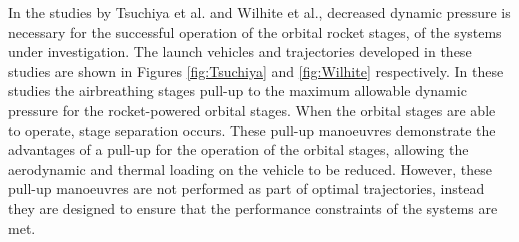 In the studies by Tsuchiya et al.\cite{Tsuchiya2005} and Wilhite et al.\cite{Wilhite1991}, decreased dynamic pressure is necessary for the successful operation of the orbital rocket stages, of the systems under investigation. The launch vehicles and trajectories developed in these studies are shown in Figures \ref{fig:Tsuchiya} and \ref{fig:Wilhite} respectively. In these studies the airbreathing stages pull-up to the maximum allowable dynamic pressure for the rocket-powered orbital stages. When the orbital stages are able to operate, stage separation occurs. These pull-up manoeuvres demonstrate the advantages of a pull-up for the operation of the orbital stages, allowing the aerodynamic and thermal loading on the vehicle to be reduced. However, these pull-up manoeuvres are not performed as part of optimal trajectories, instead they are designed to ensure that the performance constraints of the systems are met. 
